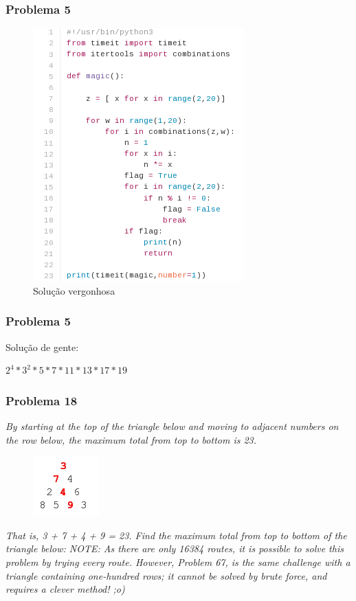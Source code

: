 \documentclass{beamer}
\begin{document}
\begin{frame}
    \frametitle{Problema 5}

    \begin{figure}[htpb]
        \centering
        \includegraphics[width=0.4\linewidth]{images/prob5.png}
        \caption{Solução vergonhosa}
    \end{figure}

\end{frame}

\begin{frame}
    \frametitle{Problema 5}

    Solução de gente:

    \begin{center}
        $2^4 * 3^2 * 5 * 7 * 11 * 13 * 17 * 19$
    \end{center}

\end{frame}

\begin{frame}
    \frametitle{Problema 18}

    \begin{center}
        \textit{
            By starting at the top of the triangle below and moving to adjacent numbers on the row below, the maximum total from top to bottom is 23.
        }
        \begin{figure}[htpb]
            \includegraphics[width=0.2\linewidth]{images/p18_1.png}
        \end{figure}
        \textit{
            That is, 3 + 7 + 4 + 9 = 23.
            Find the maximum total from top to bottom of the triangle below:
            \footnotesize NOTE: As there are only 16384 routes, it is possible to solve this problem by trying every route. However, Problem 67, is the same challenge with a triangle containing one-hundred rows; it cannot be solved by brute force, and requires a clever method! ;o)
        }
    \end{center}

\end{frame}
\end{document}

